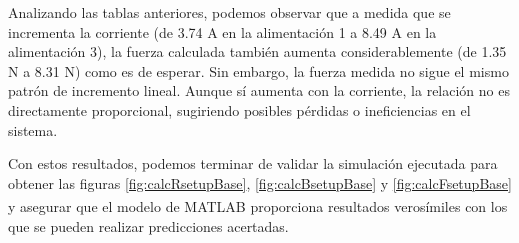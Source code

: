 Analizando las tablas anteriores, podemos observar que a medida que se incrementa la corriente (de 3.74 A en la alimentación 1 a 8.49 A en la alimentación 3), la fuerza calculada también aumenta considerablemente (de 1.35 N a 8.31 N) como es de esperar. Sin embargo, la fuerza medida no sigue el mismo patrón de incremento lineal. Aunque sí aumenta con la corriente, la relación no es directamente proporcional, sugiriendo posibles pérdidas o ineficiencias en el sistema.

Con estos resultados, podemos terminar de validar la simulación ejecutada para obtener las figuras \ref{fig:calcRsetupBase}, \ref{fig:calcBsetupBase} y \ref{fig:calcFsetupBase} y asegurar que el modelo de MATLAB\textsuperscript{\textregistered} proporciona resultados verosímiles con los que se pueden realizar predicciones acertadas.